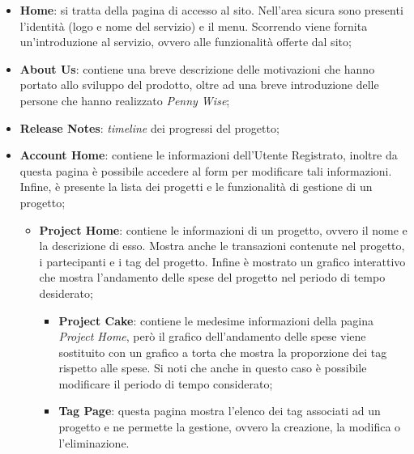 \begin{itemize}
    \item \textbf{Home}: si tratta della pagina di accesso al sito. Nell'area sicura sono presenti l'identità (logo e nome del servizio) e il menu. Scorrendo viene fornita un'introduzione al servizio, ovvero alle funzionalità offerte dal sito;

    \item \textbf{About Us}: contiene una breve descrizione delle motivazioni
		che hanno portato allo sviluppo del prodotto, oltre ad una breve
		introduzione delle persone che hanno realizzato \textit{Penny Wise};

    \item \textbf{Release Notes}: \textit{timeline} dei progressi del progetto;

    \item \textbf{Account Home}: contiene le informazioni dell'Utente Registrato, inoltre da questa pagina è possibile accedere al form per modificare tali informazioni. Infine, è presente la lista dei progetti e le funzionalità di gestione di un progetto;
    
    \begin{itemize}
        \item \textbf{Project Home}: contiene le informazioni di un progetto, ovvero il nome e la descrizione di esso. Mostra anche le transazioni contenute nel progetto, i partecipanti e i tag del progetto. Infine è mostrato un grafico interattivo che mostra l'andamento delle spese del progetto nel periodo di tempo desiderato;
        
        \begin{itemize}
            \item \textbf{Project Cake}: contiene le medesime informazioni della pagina \textit{Project Home}, però il grafico dell'andamento delle spese viene sostituito con un grafico a torta che mostra la proporzione dei tag rispetto alle spese. Si noti che anche in questo caso è possibile modificare il periodo di tempo considerato;

            \item \textbf{Tag Page}: questa pagina mostra l'elenco dei tag associati ad un progetto e ne permette la gestione, ovvero la creazione, la modifica o l'eliminazione.
        \end{itemize}
    \end{itemize}
\end{itemize}

